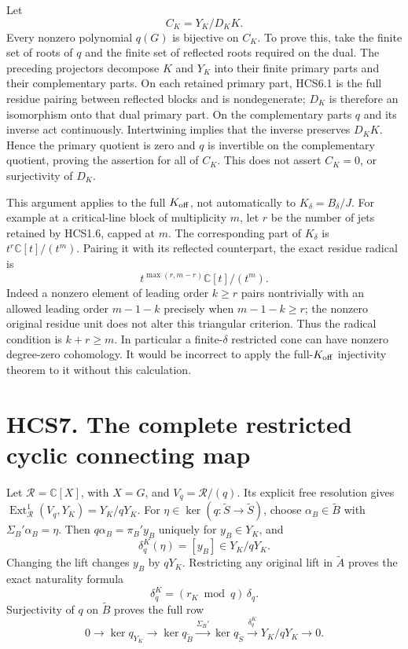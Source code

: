 Let \[
C_K=Y_K/D_KK.
\tag{HCS6.3}
\] Every nonzero polynomial \(q(G)\) is bijective on \(C_K\). To prove
this, take the finite set of roots of \(q\) and the finite set of
reflected roots required on the dual. The preceding projectors decompose
\(K\) and \(Y_K\) into their finite primary parts and their
complementary parts. On each retained primary part, HCS6.1 is the full
residue pairing between reflected blocks and is nondegenerate; \(D_K\)
is therefore an isomorphism onto that dual primary part. On the
complementary parts \(q\) and its inverse act continuously. Intertwining
implies that the inverse preserves \(D_KK\). Hence the primary quotient
is zero and \(q\) is invertible on the complementary quotient, proving
the assertion for all of \(C_K\). This does not assert \(C_K=0\), or
surjectivity of \(D_K\).

This argument applies to the full \(K_{\rm off}\), not automatically to
\(K_\delta=B_\delta/J\). For example at a critical-line block of
multiplicity \(m\), let \(r\) be the number of jets retained by HCS1.6,
capped at \(m\). The corresponding part of \(K_\delta\) is
\(t^r\mathbb C[t]/(t^m)\). Pairing it with its reflected counterpart,
the exact residue radical is \[
t^{\max(r,m-r)}\mathbb C[t]/(t^m).
\tag{HCS6.4}
\] Indeed a nonzero element of leading order \(k\ge r\) pairs
nontrivially with an allowed leading order \(m-1-k\) precisely when
\(m-1-k\ge r\); the nonzero original residue unit does not alter this
triangular criterion. Thus the radical condition is \(k+r\ge m\). In
particular a finite-\(\delta\) restricted cone can have nonzero
degree-zero cohomology. It would be incorrect to apply the
full-\(K_{\rm off}\) injectivity theorem to it without this calculation.

\section{HCS7. The complete restricted cyclic connecting
map}\label{hcs7.-the-complete-restricted-cyclic-connecting-map}

Let \(\mathcal R=\mathbb C[X]\), with \(X=G\), and
\(V_q=\mathcal R/(q)\). Its explicit free resolution gives
\(\operatorname{Ext}^1_{\mathcal R}(V_q,Y_K)=Y_K/qY_K\). For
\(\eta\in\ker(q:\widetilde S\to\widetilde S)\), choose
\(\alpha_B\in\widetilde B\) with \(\Sigma_B'\alpha_B=\eta\). Then
\(q\alpha_B=\pi_B'y_B\) uniquely for \(y_B\in Y_K\), and \[
\delta_q^K(\eta)=[y_B]\in Y_K/qY_K.
\tag{HCS7.1}
\] Changing the lift changes \(y_B\) by \(qY_K\). Restricting any
original lift in \(\widetilde A\) proves the exact naturality formula \[
\boxed{\delta_q^K=(r_K\bmod q)\,\delta_q.}
\tag{HCS7.2}
\] Surjectivity of \(q\) on \(\widetilde B\) proves the full row \[
0\to\ker q_{Y_K}\to\ker q_{\widetilde B}
\xrightarrow{\Sigma_B'}\ker q_{\widetilde S}
\xrightarrow{\delta_q^K}Y_K/qY_K\to0.
\tag{HCS7.3}
\]

